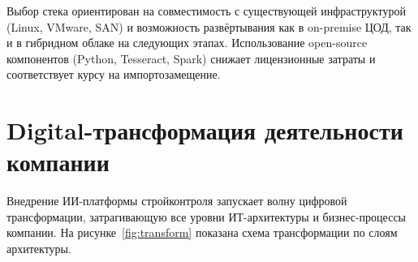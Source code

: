 \documentclass[12pt,a4paper]{article}
\begin{document}
Выбор стека ориентирован на совместимость с существующей инфраструктурой (Linux, VMware, SAN) и возможность развёртывания как в on-premise ЦОД, так и в гибридном облаке на следующих этапах. Использование open-source компонентов (Python, Tesseract, Spark) снижает лицензионные затраты и соответствует курсу на импортозамещение.

\newpage

\section{Digital-трансформация деятельности компании}

Внедрение ИИ-платформы стройконтроля запускает волну цифровой трансформации, затрагивающую все уровни ИТ-архитектуры и бизнес-процессы компании. На рисунке~\ref{fig:transform} показана схема трансформации по слоям архитектуры.
\end{document}
